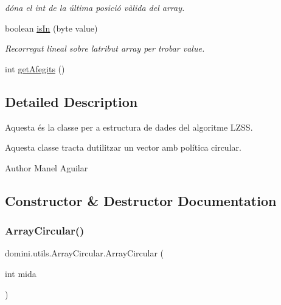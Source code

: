 \begin{DoxyCompactItemize}
\begin{DoxyCompactList}\small\item\em dóna el int de la última posició vàlida del array. \end{DoxyCompactList}\item 
boolean \hyperlink{classdomini_1_1utils_1_1ArrayCircular_aaf106d070b5937f2559a56257dc8cac3}{is\+In} (byte value)
\begin{DoxyCompactList}\small\item\em Recorregut lineal sobre l\textquotesingle{}atribut array per trobar value. \end{DoxyCompactList}\item 
int \hyperlink{classdomini_1_1utils_1_1ArrayCircular_a1c65dd3b452fa82ab8827885a7a2fbe1}{get\+Afegits} ()
\end{DoxyCompactItemize}


\subsection{Detailed Description}
Aquesta és la classe per a estructura de dades del algoritme L\+Z\+SS. 

Aquesta classe tracta d\textquotesingle{}utilitzar un vector amb política circular.

\begin{DoxyAuthor}{Author}
Manel Aguilar 
\end{DoxyAuthor}


\subsection{Constructor \& Destructor Documentation}
\mbox{\label{classdomini_1_1utils_1_1ArrayCircular_add69c3bd37b2a3ef6069bd3b5df93fec}} 
\subsubsection{\texorpdfstring{Array\+Circular()}{ArrayCircular()}}
{\footnotesize\ttfamily domini.\+utils.\+Array\+Circular.\+Array\+Circular (\begin{DoxyParamCaption}\item[{int}]{mida }\end{DoxyParamCaption})\hspace{0.3cm}{\ttfamily [inline]}}




